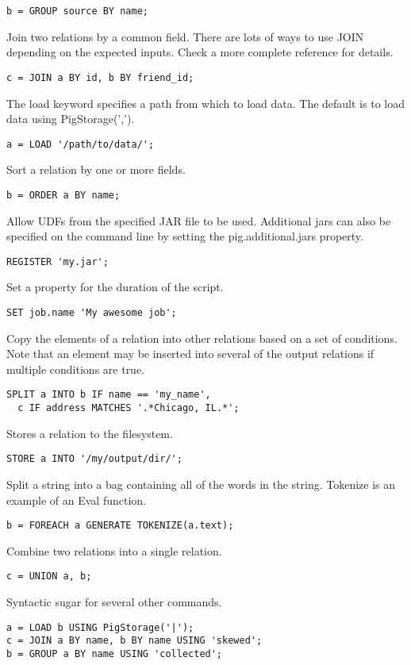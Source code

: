 \documentclass[10pt,letterpaper,twoside]{letter}
\begin{document}
\begin{multicols}{2}
\begin{description} [style=nextline]
\begin{verbatim}
b = GROUP source BY name;
\end{verbatim}
\item[JOIN$\dagger$] Join two relations by a common field.  There are lots of ways to use JOIN depending on the expected inputs.  Check a more complete reference for details. \begin{verbatim}
c = JOIN a BY id, b BY friend_id;
\end{verbatim}
\item[LOAD] The load keyword specifies a path from which to load data. The default is to load data using PigStorage(','). 
\begin{verbatim}
a = LOAD '/path/to/data/';
\end{verbatim}
\item[ORDER$\dagger$] Sort a relation by one or more fields. \begin{verbatim}
b = ORDER a BY name;
\end{verbatim}
\item[REGISTER] Allow UDFs from the specified JAR file to be used.  Additional jars can also be specified on the command line by setting the pig.additional.jars property.
\begin{verbatim}
REGISTER 'my.jar'; 
\end{verbatim}
\item[SET] Set a property for the duration of the script. 
\begin{verbatim}
SET job.name 'My awesome job';
\end{verbatim}
\item[SPLIT/INTO/IF]
Copy the elements of a relation into other relations based on a set of conditions.  Note that an element may be inserted into several of the output relations if multiple conditions are true.
\begin{verbatim}
SPLIT a INTO b IF name == 'my_name', 
  c IF address MATCHES '.*Chicago, IL.*';
\end{verbatim}
\item[STORE/INTO] Stores a relation to the filesystem. 
\begin{verbatim}
STORE a INTO '/my/output/dir/';
\end{verbatim}
\item[TOKENIZE] Split a string into a bag containing all of the words in the string.  Tokenize is an example of an Eval function.
\begin{verbatim}
b = FOREACH a GENERATE TOKENIZE(a.text);
\end{verbatim}
\item[UNION] Combine two relations into a single relation. 
\begin{verbatim}
c = UNION a, b;
\end{verbatim}
\item[USING] Syntactic sugar for several other commands.
\begin{verbatim}
a = LOAD b USING PigStorage('|');
c = JOIN a BY name, b BY name USING 'skewed';
b = GROUP a BY name USING 'collected';
\end{verbatim}
\end{description}
\end{multicols}
\end{document}
